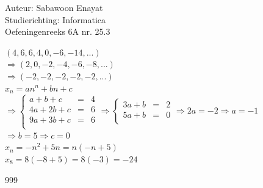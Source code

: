 \documentclass[a4paper]{article}
\begin{document}
  
\noindent \large Auteur: Sabawoon Enayat \\
\noindent \large Studierichting: Informatica\\
\noindent \large Oefeningenreeks 6A nr. 25.3 \\

\medskip

\normalsize

$(4, 6, 6, 4, 0, -6, -14, ...)$\\

$\Rightarrow (2, 0, -2, -4, -6, -8, ...)$\\

$\Rightarrow (-2, -2, -2, -2, -2, ...)$\\

$x_n = an^n + bn + c$\\

$\Rightarrow \left\{
	\begin{array}{lcr}
		 a +  b + c & = & 4\\
		4a + 2b + c & = & 6\\
		9a + 3b + c & = & 6\\
	\end{array}
\right. \Rightarrow \left\{
	\begin{array}{lcr}
		3a + b & = & 2\\
		5a + b & = & 0\\
	\end{array}
\right. \Rightarrow 2a = -2 \Rightarrow a = -1$\\

$\Rightarrow b = 5 \Rightarrow c = 0$\\

$x_n = -n^2 + 5n = n(-n + 5)$\\

$x_8 = 8(-8 + 5) = 8(-3) = -24$\\

\begin{thebibliography}{999}
\end{thebibliography}
\end{document}
